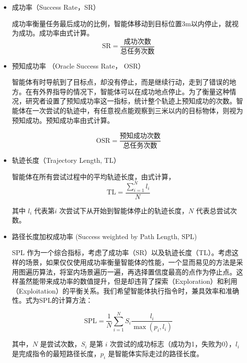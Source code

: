 \documentclass[bachelor]{thesis-uestc}
\begin{document}
\begin{itemize}
    \item 成功率（Success Rate，SR）
    
    成功率衡量任务最后成功的比例，智能体移动到目标位置3m以内停止，就视为成功。成功率由式计算。
    \begin{equation}
        \text{SR} = \frac{\text{成功次数}}{\text{总任务次数}}
    \label{sr}
    \end{equation}
    \item 预知成功率 （Oracle Success Rate， OSR）
    
    智能体有时导航到了目标点，却没有停止，而是继续行动，走到了错误的地方。在有外界指导的情况下，智能体可以在成功地点停止。为了衡量这种情况，研究者设置了预知成功率这一指标，统计整个轨迹上预知成功的次数。智能体在一次尝试的轨迹中，有任意视点能观察到三米以内的目标物体，则视为预知成功。预知成功率由式计算。

    \begin{equation}
        \text{OSR} = \frac{\text{预知成功次数}}{\text{总任务次数}}
    \label{OSR}
    \end{equation}


    \item 轨迹长度（Trajectory Length, TL）
    
    智能体在所有尝试过程中的平均轨迹长度，由式计算，
    \begin{equation}
        \text{TL} = \frac{\sum_{i=1}^N l_i}{N}
    \label{tl}
    \end{equation}

    其中 $l_i$ 代表第$i$ 次尝试下从开始到智能体停止的轨迹长度，$N$ 代表总尝试次数。

    \item 路径长度加权成功率 (Success weighted by Path Length, SPL)
    
    SPL 作为一个综合指标，考虑了成功率（SR）以及轨迹长度（TL）。考虑这样的场景，如果仅仅使用成功率衡量智能体的性能，一个显而易见的方法是采用图遍历算法，将室内场景遍历一遍，再选择置信度最高的点作为停止点。这样虽然能带来成功率的数值提升，但是却违背了探索（Exploration）和利用（Exploitation）的平衡关系。我们希望智能体执行指令时，兼具效率和准确性。式为SPL的计算方法：

    \begin{equation}
        \text{SPL} = \frac{1}{N} \sum_{i=1}^{N} S_i \frac{l_i}{\max(p_i, l_i)}
    \label{spl}
    \end{equation}

    其中，\( N \) 是尝试次数，\( S_i \) 是第 \( i \) 次尝试的成功标志（成功为1，失败为0），\( l_i \) 是完成指令的最短路径长度，\( p_i \) 是智能体实际走过的路径长度。
\end{itemize}
\end{document}
